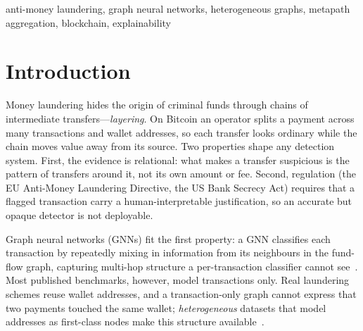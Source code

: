 \documentclass[conference]{IEEEtran}
\begin{document}
\begin{IEEEkeywords}
anti-money laundering, graph neural networks, heterogeneous graphs, metapath
aggregation, blockchain, explainability
\end{IEEEkeywords}

\section{Introduction}

Money laundering hides the origin of criminal funds through chains of
intermediate transfers---\emph{layering}. On Bitcoin an operator splits a
payment across many transactions and wallet addresses, so each transfer looks
ordinary while the chain moves value away from its source. Two properties
shape any detection system. First, the evidence is relational: what makes a
transfer suspicious is the pattern of transfers around it, not its own amount
or fee. Second, regulation (the EU Anti-Money Laundering Directive, the US
Bank Secrecy Act) requires that a flagged transaction carry a
human-interpretable justification, so an accurate but opaque detector is not
deployable.

Graph neural networks (GNNs) fit the first property: a GNN classifies each
transaction by repeatedly mixing in information from its neighbours in the
fund-flow graph, capturing multi-hop structure a per-transaction classifier
cannot see~\cite{ferretti2025}. Most published benchmarks, however, model
transactions only. Real laundering schemes reuse wallet addresses, and a
transaction-only graph cannot express that two payments touched the same
wallet; \emph{heterogeneous} datasets that model addresses as first-class
nodes make this structure available~\cite{song2023}.
\end{document}
